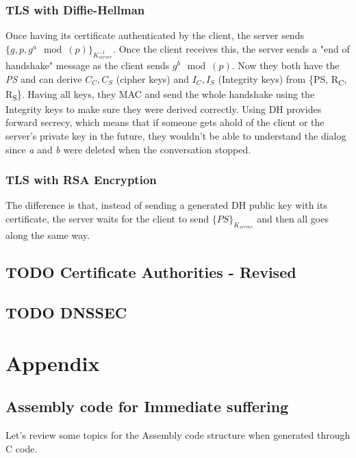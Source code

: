 \documentclass[11pt]{article}
\begin{document}
{\subsubsection{TLS with Diffie-Hellman}
\label{sec:orge8b7ede}
Once having its certificate authenticated by the client, the server sends \(\{g,p,g^a \mod(p)\}_{K_{server}^{-1}}\). Once the client receives this, the server sends a "end of handshake" message as the client sends \(g^b \mod(p)\). Now they both have the \emph{PS} and can derive \(C_C, C_S\) (cipher keys) and \(I_C, I_S\) (Integrity keys) from \{PS, R\textsubscript{C}, R\textsubscript{S}\}. Having all keys, they MAC and send the whole handshake using the Integrity keys to make sure they were derived correctly. Using DH provides forward secrecy, which means that if someone gets ahold of the client or the server's private key in the future, they wouldn't be able to understand the dialog since \emph{a} and \emph{b} were deleted when the conversation stopped.
\subsubsection{TLS with RSA Encryption}
\label{sec:orga3757ec}
The difference is that, instead of sending a generated DH public key with its certificate, the server waits for the client to send \(\{PS\}_{K_{server}}\) and then all goes along the same way. 
\subsection{{\bfseries\sffamily TODO} Certificate Authorities - Revised}
\label{sec:orgc5bede1}
\subsection{{\bfseries\sffamily TODO} DNSSEC}
\label{sec:org3b73afc}

\section{Appendix}
\label{sec:org25e44fc}
\subsection{Assembly code for Immediate suffering}
\label{sec:orga24d240}
\label{sec:Assemble}
Let's review some topics for the Assembly code structure when generated through C code.
}
\end{document}
